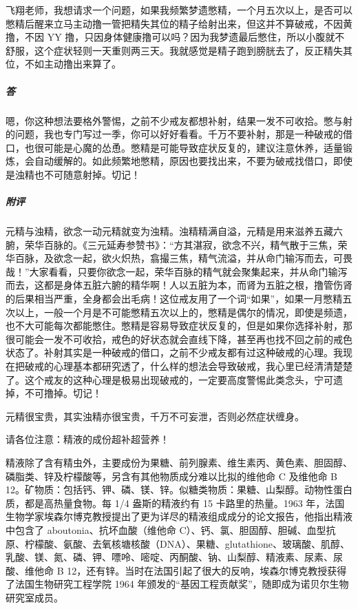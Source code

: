 \begin{case}
    飞翔老师，我想请求一个问题，如果我频繁梦遗憋精，一个月五次以上，是否可以憋精后醒来立马主动撸一管把精失其位的精子给射出来，但这并不算破戒，不因黄撸，不因 YY 撸，只因身体健康撸可以吗？因为我梦遗最后憋住，所以小腹就不舒服，这个症状轻则一天重则两三天。我就感觉是精子跑到膀胱去了，反正精失其位，不如主动撸出来算了。
    \subparagraph{答} 嗯，你这种想法要格外警惕，之前不少戒友都想补射，结果一发不可收拾。憋与射的问题，我也专门写过一季，你可以好好看看。千万不要补射，那是一种破戒的借口，也很可能是心魔的怂恿。憋精是可能导致症状反复的，建议注意休养，适量锻炼，会自动缓解的。如此频繁地憋精，原因也要找出来，不要为破戒找借口，即使是浊精也不可随意射掉。切记！
    \subparagraph{附评} 元精与浊精，欲念一动元精就变为浊精。浊精精满自溢，元精是用来滋养五藏六腑，荣华百脉的。《三元延寿参赞书》：“方其湛寂，欲念不兴，精气散于三焦，荣华百脉，及欲念一起，欲火炽热，翕撮三焦，精气流溢，并从命门输泻而去，可畏哉！”大家看看，只要你欲念一起，荣华百脉的精气就会聚集起来，并从命门输泻而去，这都是身体五脏六腑的精华啊！人以五脏为本，而肾为五脏之根，撸管伤肾的后果相当严重，全身都会出毛病！这位戒友用了一个词“如果”，如果一月憋精五次以上，一般一个月是不可能憋精五次以上的，憋精是偶尔的情况，即使是频遗，也不大可能每次都能憋住。憋精是容易导致症状反复的，但是如果你选择补射，那很可能会一发不可收拾，戒色的好状态就会直线下降，甚至再也找不回之前的戒色状态了。补射其实是一种破戒的借口，之前不少戒友都有过这种破戒的心理。我现在把破戒的心理基本都研究透了，什么样的想法会导致破戒，我心里已经清清楚楚了。这个戒友的这种心理是极易出现破戒的，一定要高度警惕此类念头，宁可遗掉，不可撸掉。切记！

    元精很宝贵，其实浊精亦很宝贵，千万不可妄泄，否则必然症状缠身。

    请各位注意：精液的成份超补超营养！

    精液除了含有精虫外，主要成份为果糖、前列腺素、维生素丙、黄色素、胆固醇、磷脂类、锌及柠檬酸等，另含有其他物质成分难以比拟的维他命 C 及维他命 B 12。矿物质：包括钙、钾、磷、镁、锌。似糖类物质：果糖、山梨醇。动物性蛋白质，都是高热量食物。每 1/4 盎斯的精液约有 15 卡路里的热量。1963 年，法国生物学家埃森尔博克教授提出了更为详尽的精液组成成分的论文报告，他指出精液中包含了 aboutonia、抗坏血酸（维他命 C）、钙、氯、胆固醇、胆碱、血型抗原、柠檬酸、氨酸、去氧核塘核酸（DNA）、果糖、glutathione、玻璃酸、肌醇、乳酸、镁、氮、磷、钾、嘌呤、嘧啶、丙酮酸、钠、山梨醇、精液素、尿素、尿酸、维他命 B 12，还有锌。当时在法国引起了很大的反响，埃森尔博克教授获得了法国生物研究工程学院 1964 年颁发的“基因工程贡献奖”，随即成为诺贝尔生物研究室成员。
\end{case}

